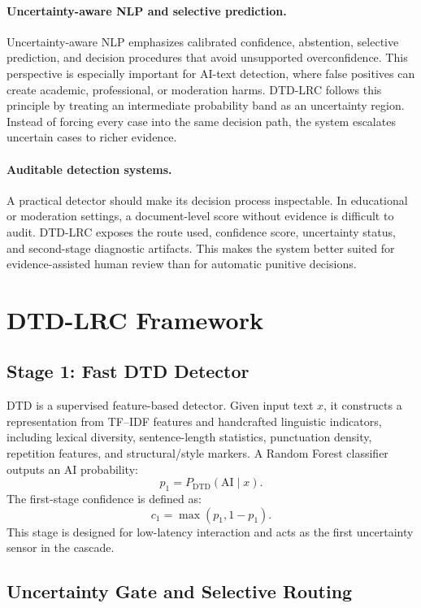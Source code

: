 \documentclass[11pt]{article}
\begin{document}
\paragraph{Uncertainty-aware NLP and selective prediction.}
Uncertainty-aware NLP emphasizes calibrated confidence, abstention, selective prediction, and decision procedures that avoid unsupported overconfidence. This perspective is especially important for AI-text detection, where false positives can create academic, professional, or moderation harms. DTD-LRC follows this principle by treating an intermediate probability band as an uncertainty region. Instead of forcing every case into the same decision path, the system escalates uncertain cases to richer evidence.

\paragraph{Auditable detection systems.}
A practical detector should make its decision process inspectable. In educational or moderation settings, a document-level score without evidence is difficult to audit. DTD-LRC exposes the route used, confidence score, uncertainty status, and second-stage diagnostic artifacts. This makes the system better suited for evidence-assisted human review than for automatic punitive decisions.

\section{DTD-LRC Framework}

\subsection{Stage 1: Fast DTD Detector}

DTD is a supervised feature-based detector. Given input text $x$, it constructs a representation from TF--IDF features and handcrafted linguistic indicators, including lexical diversity, sentence-length statistics, punctuation density, repetition features, and structural/style markers. A Random Forest classifier outputs an AI probability:
\[
p_1 = P_{\mathrm{DTD}}(\mathrm{AI}\mid x).
\]
The first-stage confidence is defined as:
\[
c_1 = \max(p_1, 1-p_1).
\]
This stage is designed for low-latency interaction and acts as the first uncertainty sensor in the cascade.

\subsection{Uncertainty Gate and Selective Routing}
\end{document}
